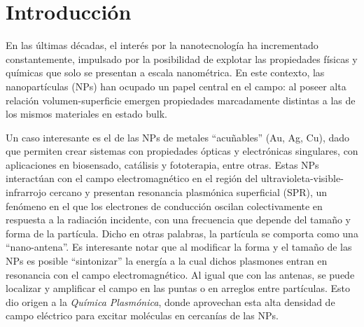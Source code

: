 \section{Introducción}

En las últimas décadas, el interés por la nanotecnología ha incrementado constantemente, impulsado por la posibilidad de explotar las propiedades físicas y  químicas que solo se presentan a escala nanométrica. %
En este contexto, las nanopartículas (NPs) han ocupado un papel central en el campo: al poseer alta relación volumen-superficie emergen propiedades marcadamente distintas a las de los mismos materiales en estado bulk. %

Un caso interesante es el de las NPs de metales ``acuñables'' (Au, Ag, Cu), dado que permiten crear sistemas con propiedades ópticas y electrónicas singulares, con aplicaciones en biosensado, catálisis y fototerapia, entre otras. Estas NPs interactúan con el campo electromagnético en el región del ultravioleta-visible-infrarrojo cercano y presentan resonancia plasmónica superficial (SPR), un fenómeno en el que los electrones de conducción oscilan colectivamente en respuesta a la radiación incidente, con una frecuencia que depende del tamaño y forma de la partícula.\cite{zhang2011} Dicho en otras palabras, la partícula se comporta como una ``nano-antena''. Es interesante notar que al modificar la forma y el tamaño de las NPs es posible ``sintonizar'' la energía a la cual dichos plasmones entran en resonancia con el campo electromagnético. Al igual que con las antenas, se puede localizar y amplificar el campo en las puntas o en arreglos entre partículas.\cite{cortesPlasmonicHotElectron2017} Esto dio origen a la \textit{Química Plasmónica}, donde aprovechan esta alta densidad de campo eléctrico para excitar moléculas en cercanías de las NPs.

